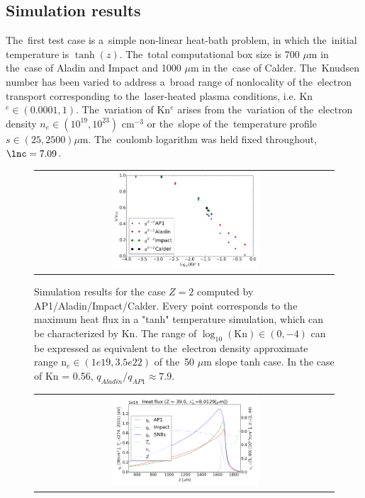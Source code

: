 \subsection{Simulation results}
\label{sec:SimulationResults}
The~first test case is a~simple non-linear heat-bath problem, 
in which the~initial temperature is $\tanh(z)$.  
The~total computational box size is 700 $\mu$m in the~case
of Aladin and Impact and 1000 $\mu$m in the~case of Calder.
The~Knudsen number has been varied to address a~broad range of nonlocality of 
the~electron transport corresponding to the~laser-heated plasma conditions,
i.e. Kn$^e \in (0.0001, 1)$. The~variation of Kn$^e$ arises from the~variation
of the~electron density $n_e \in (10^{19}, 10^{23})$ cm$^{-3}$ or the~slope of 
the~temperature profile $s \in (25, 2500) \mu$m. The~coulomb logarithm was held
fixed throughout, $\lnc = 7.09$. 

\begin{figure}[tbh]
  \begin{center}
    \begin{tabular}{c}
      \includegraphics[width=0.5\textwidth]{Kn_results.png}
    \end{tabular}
  \caption{  
  Simulation results for the case $Z=2$ computed by AP1/Aladin/Impact/Calder.
  Every point corresponds to the maximum heat flux in a "tanh" temperature 
  simulation, which can be characterized by Kn. The range of 
  $\log_{10}(\text{Kn})\in (0, -4)$ can be expressed as equivalent 
  to the~electron density approximate range n$_e \in (1e19, 3.5e22)$ of 
  the~50 $\mu$m slope tanh case. In the case of Kn = 0.56, 
  $q_{Aladin} / q_{AP1}\approx 7.9$.}
  \label{fig:Kn_results}
  \end{center} 
\end{figure}

\begin{figure}[tbh]
  \begin{center}
    \begin{tabular}{c}
      \includegraphics[width=0.5\textwidth]{../VFPdata/GD_Hohlraum/fluxes_10ps.png} 
    \end{tabular}
  \caption{
  }
  \label{fig:Gd_VFP_10ps_heatflux}
  \end{center} 
\end{figure}

